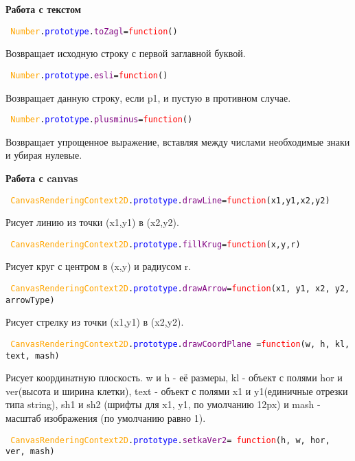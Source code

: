 \textbf{Работа с текстом}

\hypertarget{toZagl}{\texttt{
	\textcolor{Orange}{Number}.\textcolor{Blue}{prototype}.\textcolor{Purple}{toZagl}=\textcolor{Red}{function}()
}}

Возвращает исходную строку с первой заглавной буквой.

\texttt{
	\textcolor{Orange}{Number}.\textcolor{Blue}{prototype}.\textcolor{Purple}{esli}=\textcolor{Red}{function}()
}

Возвращает данную строку, если p1, и пустую в противном случае.

\texttt{
	\textcolor{Orange}{Number}.\textcolor{Blue}{prototype}.\textcolor{Purple}{plusminus}=\textcolor{Red}{function}()
}

Возвращает упрощенное выражение, вставляя между числами необходимые знаки и убирая нулевые.

\textbf{Работа с canvas}

\texttt{
	\textcolor{Orange}{CanvasRenderingContext2D}.\textcolor{Blue}{prototype}.\textcolor{Purple}{drawLine}=\textcolor{Red}{function}(x1,y1,x2,y2)
}

Рисует линию из точки (x1,y1) в (x2,y2).

\texttt{
	\textcolor{Orange}{CanvasRenderingContext2D}.\textcolor{Blue}{prototype}.\textcolor{Purple}{fillKrug}=\textcolor{Red}{function}(x,y,r)
}

Рисует круг с центром в (x,y) и радиусом r.

\texttt{
	\textcolor{Orange}{CanvasRenderingContext2D}.\textcolor{Blue}{prototype}.\textcolor{Purple}{drawArrow}=\textcolor{Red}{function}(x1, y1, x2, y2, arrowType)
}%

Рисует стрелку из точки (x1,y1) в (x2,y2).

\hypertarget{drawCoordPlane}{\texttt{
	\textcolor{Orange}{CanvasRenderingContext2D}.\textcolor{Blue}{prototype}.\textcolor{Purple}{drawCoordPlane }=\textcolor{Red}{function}(w, h, kl, text, mash)
}}

Рисует координатную плоскость. w и h  \-- её размеры, kl \-- объект с полями hor и ver(высота и ширина клетки), text \-- объект с полями x1 и y1(единичные отрезки типа string), sh1 и sh2 (шрифты для x1, y1, по умолчанию 12px) и mash - масштаб изображения (по умолчанию равно 1).

\texttt{
	\textcolor{Orange}{CanvasRenderingContext2D}.\textcolor{Blue}{prototype}.\textcolor{Purple}{setkaVer2}=
	\newline
	\textcolor{Red}{function}(h, w, hor, ver, mash)
}

